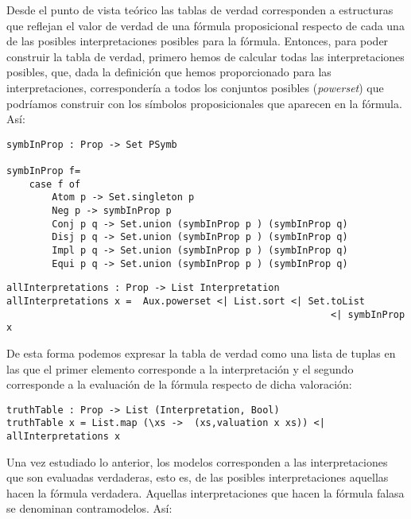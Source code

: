 \documentclass[a4paper]{report}
\begin{document}
Desde el punto de vista teórico las tablas de verdad corresponden a estructuras que reflejan el valor de verdad de una fórmula proposicional respecto de cada una de las posibles interpretaciones posibles para la fórmula. Entonces, para poder construir la tabla de verdad, primero hemos de calcular todas las interpretaciones posibles, que, dada la definición que hemos proporcionado para las interpretaciones, correspondería a todos los conjuntos posibles (\textit{powerset}) que podríamos construir con los símbolos proposicionales que aparecen en la fórmula. Así:\\

\begin{lstlisting}[caption= Función para extraer los símbolos proposicionales que intervienen en una fórmula]
symbInProp : Prop -> Set PSymb

symbInProp f=
    case f of
        Atom p -> Set.singleton p
        Neg p -> symbInProp p
        Conj p q -> Set.union (symbInProp p ) (symbInProp q)
        Disj p q -> Set.union (symbInProp p ) (symbInProp q)
        Impl p q -> Set.union (symbInProp p ) (symbInProp q)
        Equi p q -> Set.union (symbInProp p ) (symbInProp q)
\end{lstlisting}

\begin{lstlisting}[caption= Función para extraer las posibles interpretaciones para una fórmula propsicional]
allInterpretations : Prop -> List Interpretation
allInterpretations x =  Aux.powerset <| List.sort <| Set.toList 
                                                         <| symbInProp x
\end{lstlisting}

De esta forma podemos expresar la tabla de verdad como una lista de tuplas en las que el primer elemento corresponde a la interpretación y el segundo corresponde a la evaluación de la fórmula respecto de dicha valoración:\\

\begin{lstlisting}[caption= Función para la construcción de la tabla de verdad de una fórmula]
truthTable : Prop -> List (Interpretation, Bool)
truthTable x = List.map (\xs ->  (xs,valuation x xs)) <| allInterpretations x
\end{lstlisting}

Una vez estudiado lo anterior, los modelos corresponden a las interpretaciones que son evaluadas verdaderas, esto es, de las posibles interpretaciones aquellas hacen la fórmula verdadera. Aquellas interpretaciones que hacen la fórmula falasa se denominan contramodelos. Así:\\
\end{document}
